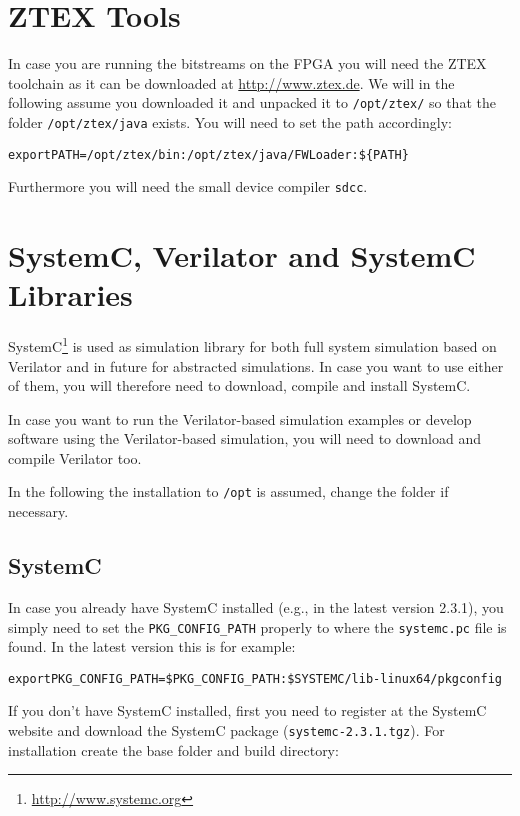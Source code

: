 \section{ZTEX Tools}

In case you are running the bitstreams on the FPGA you will need the
ZTEX toolchain as it can be downloaded at \url{http://www.ztex.de}. We
will in the following assume you downloaded it and unpacked it to
\verb|/opt/ztex/| so that the folder \verb|/opt/ztex/java| exists. You
will need to set the path accordingly:

\begin{alltt}
export PATH=/opt/ztex/bin:/opt/ztex/java/FWLoader:\$\{PATH\}
\end{alltt}

Furthermore you will need the small device compiler \verb|sdcc|.

\section{SystemC, Verilator and SystemC Libraries}

SystemC\footnote{\url{http://www.systemc.org}} is used as simulation
library for both full system simulation based on Verilator and in
future for abstracted simulations. In case you want to use either of
them, you will therefore need to download, compile and install
SystemC.

In case you want to run the Verilator-based simulation examples or
develop software using the Verilator-based simulation, you will need
to download and compile Verilator too.

In the following the installation to \verb|/opt| is assumed, change
the folder if necessary.

\subsection{SystemC}

In case you already have SystemC installed (e.g., in the latest
version 2.3.1), you simply need to set the \verb|PKG_CONFIG_PATH|
properly to where the \verb|systemc.pc| file is found. In the latest
version this is for example:

\begin{alltt}
export PKG_CONFIG_PATH=\$PKG_CONFIG_PATH:\$SYSTEMC/lib-linux64/pkgconfig
\end{alltt}

If you don't have SystemC installed, first you need to register at the
SystemC website and download the SystemC package
(\verb|systemc-2.3.1.tgz|). For installation create the base folder
and build directory:

